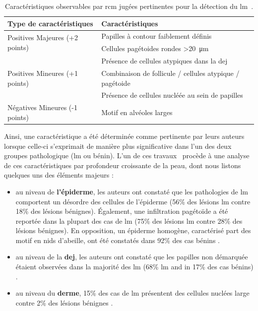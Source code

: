 \begin{table}[H]
\centering
    \begin{tabular}{ll}
        \toprule
        Type de caractéristiques                        & Caractéristiques                                              \\\hline
        \multirow{2}{*}{Positives Majeures (+2 points)} & Papilles à contour faiblement définis                         \\\cline{2-2}
                                                        & Cellules pagétoides rondes >\SI{20}{\micro\metre}             \\\hline
        \multirow{3}{*}{Positives Mineures (+1 points)} & Présence de cellules atypiques dans la \gls{dej}              \\\cline{2-2}
                                                        & Combinaison de follicule / cellules atypique / pagétoide      \\\cline{2-2}
                                                        & Présence de cellules nucléée au sein de papilles              \\\hline
        Négatives Mineures (-1 points)                  & Motif en alvéoles larges                                      \\
        \bottomrule
    \end{tabular}
\caption{Caractéristiques observables par \gls{rcm} jugées pertinentes pour la détection du \gls{lm}~\cite{Guitera2010}.}
\label{tab:rcm_algorithm_lentigo}
\end{table}\par
 
Ainsi, une caractéristique a été déterminée comme pertinente par leurs auteurs~\cite{Pellacani2007, Guitera2010} lorsque celle-ci s'exprimait de manière plus significative dans l'un des deux groupes pathologique (\gls{lm} ou bénin). L'un de ces travaux~\cite{Guitera2010} procède à une analyse de ces caractéristiques par profondeur croissante de la peau, dont nous listons quelques uns des éléments majeurs :
\begin{itemize}
    \item au niveau de \textbf{l'épiderme}, les auteurs ont constaté que les pathologies de \gls{lm} comportent un désordre des cellules de l'épiderme (56\% des lésions \gls{lm} contre 18\% des lésions bénignes). Également, une infiltration pagétoïde a été reportée dans la plupart des cas de \gls{lm} (75\% des lésions \gls{lm} contre 28\% des lésions bénignes). En opposition, un épiderme homogène, caractérisé part des motif en nids d'abeille, ont été constatés dans 92\% des cas bénins .
    \item au niveau de la \textbf{\gls{dej}}, les auteurs ont constaté que les papilles non démarquée étaient observées dans la majorité des \gls{lm} (68\% \gls{lm} and in 17\% des cas bénins) .
    \item au niveau du \textbf{derme}, 15\% des cas de \gls{lm} présentent des cellules nuclées large contre 2\% des lésions bénignes .
\end{itemize}\par

